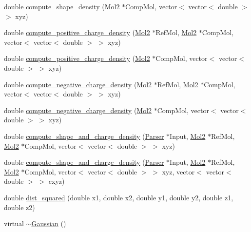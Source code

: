\begin{DoxyCompactItemize}
\item 
double \hyperlink{classGaussian_a5b038af926d8a733608e41cdf263241a}{compute\_\-shape\_\-density} (\hyperlink{classMol2}{Mol2} $\ast$CompMol, vector$<$ vector$<$ double $>$ $>$ xyz)
\item 
double \hyperlink{classGaussian_ada6ef41c5cf1a988313f917dac04ba55}{compute\_\-positive\_\-charge\_\-density} (\hyperlink{classMol2}{Mol2} $\ast$RefMol, \hyperlink{classMol2}{Mol2} $\ast$CompMol, vector$<$ vector$<$ double $>$ $>$ xyz)
\item 
double \hyperlink{classGaussian_ab2876d1355fd67cad5faa87062f20348}{compute\_\-positive\_\-charge\_\-density} (\hyperlink{classMol2}{Mol2} $\ast$CompMol, vector$<$ vector$<$ double $>$ $>$ xyz)
\item 
double \hyperlink{classGaussian_a153b1fc8036233bed9121aa343c2a74d}{compute\_\-negative\_\-charge\_\-density} (\hyperlink{classMol2}{Mol2} $\ast$RefMol, \hyperlink{classMol2}{Mol2} $\ast$CompMol, vector$<$ vector$<$ double $>$ $>$ xyz)
\item 
double \hyperlink{classGaussian_a141239850ea75332536cd25ef725762a}{compute\_\-negative\_\-charge\_\-density} (\hyperlink{classMol2}{Mol2} $\ast$CompMol, vector$<$ vector$<$ double $>$ $>$ xyz)
\item 
double \hyperlink{classGaussian_ae28140feb3ad3043854394808e97b4cf}{compute\_\-shape\_\-and\_\-charge\_\-density} (\hyperlink{classParser}{Parser} $\ast$Input, \hyperlink{classMol2}{Mol2} $\ast$RefMol, \hyperlink{classMol2}{Mol2} $\ast$CompMol, vector$<$ vector$<$ double $>$ $>$ xyz)
\item 
double \hyperlink{classGaussian_a32bff8dbdd688b7d1d8f7aa50463ae82}{compute\_\-shape\_\-and\_\-charge\_\-density} (\hyperlink{classParser}{Parser} $\ast$Input, \hyperlink{classMol2}{Mol2} $\ast$RefMol, \hyperlink{classMol2}{Mol2} $\ast$CompMol, vector$<$ vector$<$ double $>$ $>$ xyz, vector$<$ vector$<$ double $>$ $>$ cxyz)
\item 
double \hyperlink{classGaussian_ae9535543b557e8481b3b7ad1e559d4c0}{dist\_\-squared} (double x1, double x2, double y1, double y2, double z1, double z2)
\item 
virtual \hyperlink{classGaussian_acf8cb96837ea65021e973a735260be5f}{$\sim$Gaussian} ()
\end{DoxyCompactItemize}
